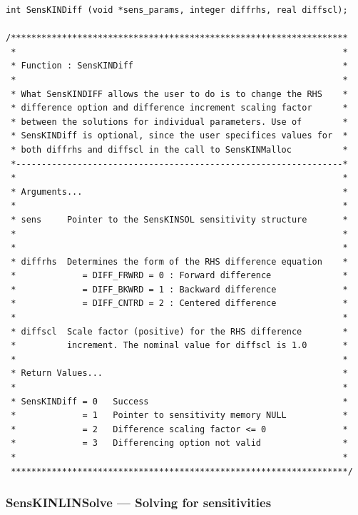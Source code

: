 \documentclass[11pt]{article}
\begin{document}
\small
\begin{verbatim}
int SensKINDiff (void *sens_params, integer diffrhs, real diffscl);

/******************************************************************
 *                                                                *
 * Function : SensKINDiff                                         *
 *                                                                *
 * What SensKINDIFF allows the user to do is to change the RHS    *
 * difference option and difference increment scaling factor      *
 * between the solutions for individual parameters. Use of        *
 * SensKINDiff is optional, since the user specifices values for  *
 * both diffrhs and diffscl in the call to SensKINMalloc          *
 *----------------------------------------------------------------*
 *                                                                *
 * Arguments...                                                   *
 *                                                                *
 * sens     Pointer to the SensKINSOL sensitivity structure       *
 *                                                                *
 *                                                                *
 * diffrhs  Determines the form of the RHS difference equation    *
 *             = DIFF_FRWRD = 0 : Forward difference              *
 *             = DIFF_BKWRD = 1 : Backward difference             *
 *             = DIFF_CNTRD = 2 : Centered difference             *
 *                                                                *
 * diffscl  Scale factor (positive) for the RHS difference        *
 *          increment. The nominal value for diffscl is 1.0       *
 *                                                                *
 * Return Values...                                               *
 *                                                                *
 * SensKINDiff = 0   Success                                      *
 *             = 1   Pointer to sensitivity memory NULL           *
 *             = 2   Difference scaling factor <= 0               *
 *             = 3   Differencing option not valid                *
 *                                                                *
 ******************************************************************/
\end{verbatim}
\normalsize

\subsubsection{SensKINLINSolve --- Solving for sensitivities}
\end{document}
